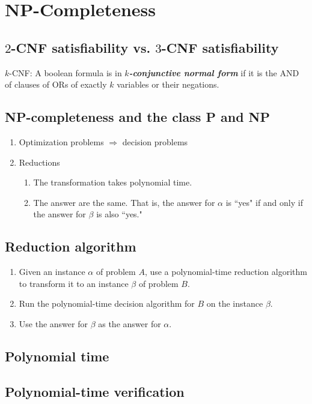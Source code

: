 \documentclass[letter]{book}
\theoremstyle{definition}
\theoremstyle{definition}
\theoremstyle{remark}
\begin{document}
\setcounter{chapter}{33}

\chapter{NP-Completeness}
\section*{$2$-CNF satisfiability vs. $3$-CNF satisfiability}
$k$-CNF: A boolean formula is in \textit{\textbf{$k$-conjunctive normal form}} if it is the AND of clauses of ORs of exactly $k$ variables or their negations.

\section*{NP-completeness and the class P and NP}
\begin{enumerate}
    \item Optimization problems $\Rightarrow$ decision problems
    \item Reductions
        \begin{enumerate}
            \item The transformation takes polynomial time.
            \item The answer are the same. That is, the answer for $\alpha$ is ``yes" if and only if the answer for $\beta$ is also ``yes."
        \end{enumerate}
\end{enumerate}
\section*{Reduction algorithm}
\begin{enumerate}
    \item Given an instance $\alpha$ of problem $A$, use a polynomial-time reduction algorithm to transform it to an instance $\beta$ of problem $B$.
    \item Run the polynomial-time decision algorithm for $B$ on the instance $\beta$.
    \item Use the answer for $\beta$ as the answer for $\alpha$.
\end{enumerate}
\section{Polynomial time}
\section{Polynomial-time verification}
\end{document}
